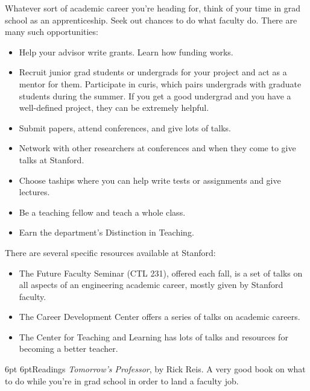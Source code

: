 \documentclass[10pt]{book}
\makeatletter
\renewcommand{\subsection}{\@startsection{subsection}{2}{0mm}%
   {6pt}%
   {6pt}{\normalfont\normalsize\itshape}}
\makeatother
\begin{document}
Whatever sort of academic career you're heading for, think of your
time in grad school as an apprenticeship. Seek out chances to do what faculty do.
There are many such opportunities:

\begin{itemize}
\item Help your advisor write grants.  Learn how funding works.
\item Recruit junior grad students or undergrads for your project and act as a
mentor for them. Participate in {\sc curis}, which pairs
undergrads with graduate students during the summer. If you get a good
undergrad and you have a well-defined project, they can be extremely helpful.

\item Submit papers, attend conferences, and give lots of talks.

\item Network with other researchers at conferences and when they come to give
talks at Stanford.

\item Choose {\sc ta}ships where you can help write tests or assignments and
give lectures.

\item Be a teaching fellow and teach a whole class.

\item Earn the department's Distinction in Teaching.
\end{itemize}

There are several specific resources available at Stanford:

\begin{itemize}
\item The Future Faculty Seminar ({\sc CTL} 231), offered each fall, is a set of
talks on all aspects of an engineering academic career, mostly given by
Stanford faculty.

\item The Career Development Center offers a series of talks on academic
careers.

\item The Center for Teaching and Learning has lots of talks and resources for
becoming a better teacher.
\end{itemize}

\subsection{Readings}
{\it Tomorrow's Professor}, by Rick Reis. A very good book on what to do while
you're in grad school in order to land a faculty job.
\end{document}
